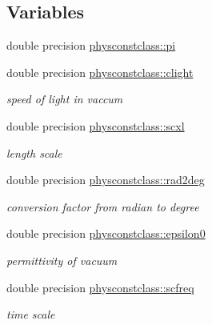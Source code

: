 \subsection*{Variables}
\begin{DoxyCompactItemize}
\item 
double precision \mbox{\hyperlink{namespacephysconstclass_a78e5b579cf4c062c45ae0f9922355783}{physconstclass\+::pi}}
\item 
double precision \mbox{\hyperlink{namespacephysconstclass_a8622c3bd03bb3706b061386b694c8f71}{physconstclass\+::clight}}
\begin{DoxyCompactList}\small\item\em speed of light in vaccum \end{DoxyCompactList}\item 
double precision \mbox{\hyperlink{namespacephysconstclass_af2c99b666d1986d824837a37dd85cd50}{physconstclass\+::scxl}}
\begin{DoxyCompactList}\small\item\em length scale \end{DoxyCompactList}\item 
double precision \mbox{\hyperlink{namespacephysconstclass_a1f59be9127e8be0b50b2f15277976fb2}{physconstclass\+::rad2deg}}
\begin{DoxyCompactList}\small\item\em conversion factor from radian to degree \end{DoxyCompactList}\item 
double precision \mbox{\hyperlink{namespacephysconstclass_affe5679370336ffdace4ff9f095211f9}{physconstclass\+::epsilon0}}
\begin{DoxyCompactList}\small\item\em permittivity of vacuum \end{DoxyCompactList}\item 
double precision \mbox{\hyperlink{namespacephysconstclass_a72551429ee6cdefac23bdaafc09bb169}{physconstclass\+::scfreq}}
\begin{DoxyCompactList}\small\item\em time scale \end{DoxyCompactList}\end{DoxyCompactItemize}
